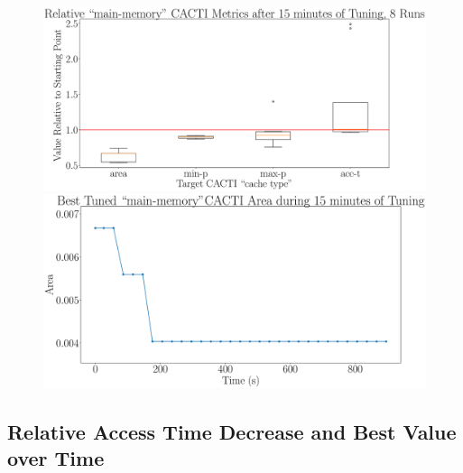 \documentclass[12pt, a4paper]{article}
\begin{document}
\begin{figure}[htpb]
    \begin{minipage}{.48\textwidth}
        \centering
        \includegraphics[width=.8\textwidth]{target_area_900_1_main-memory}
    \end{minipage}%
    \begin{minipage}{.48\textwidth}
        \centering
        \includegraphics[width=.8\textwidth]{target_area_900_1_main-memory_best}
    \end{minipage}%
\end{figure}

\newpage

\subsection{Relative Access Time Decrease and Best Value over Time}
\end{document}
